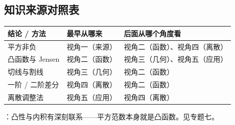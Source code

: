 \begin{afterclass}
\subsection{知识来源对照表}
\begin{center}
\footnotesize
\setlength{\tabcolsep}{4pt}
\renewcommand{\arraystretch}{1.35}
\begin{tabular}{p{3.4cm}p{4.0cm}p{5.6cm}}
\toprule
结论 / 方法 & 最早从哪来 & 后面从哪个角度看 \\
\midrule
平方非负 & 视角一（来源） & 视角二（函数）、视角四（离散） \\
凸函数与 Jensen & 视角二（函数） & 视角三（几何）、视角五（应用） \\
切线与割线 & 视角三（几何） & 视角二（函数） \\
一阶 / 二阶差分 & 视角四（离散） & 视角二（函数） \\
离散调整法 & 视角五（应用） & 视角四（离散） \\
\bottomrule
\end{tabular}
\end{center}

：凸性与内积有深刻联系——平方范数本身就是凸函数。见专题七。
\end{afterclass}
